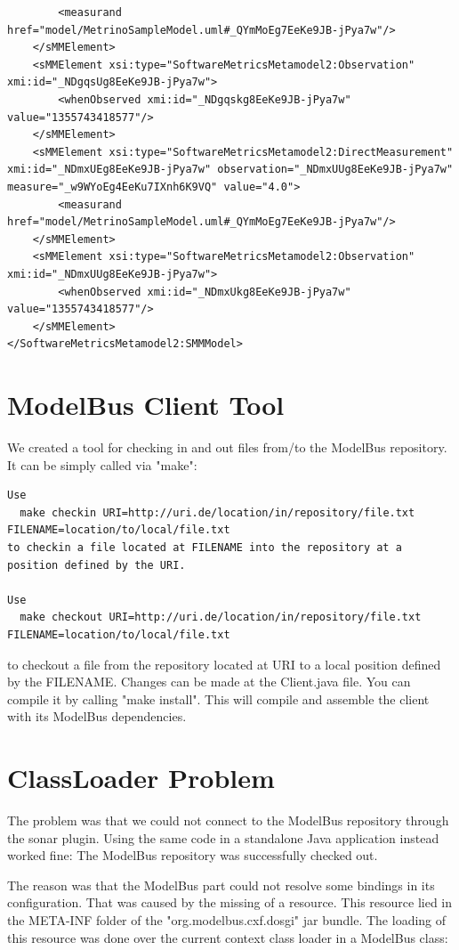 \begin{verbatim}
        <measurand href="model/MetrinoSampleModel.uml#_QYmMoEg7EeKe9JB-jPya7w"/>
    </sMMElement>
    <sMMElement xsi:type="SoftwareMetricsMetamodel2:Observation" xmi:id="_NDgqsUg8EeKe9JB-jPya7w">
        <whenObserved xmi:id="_NDgqskg8EeKe9JB-jPya7w" value="1355743418577"/>
    </sMMElement>
    <sMMElement xsi:type="SoftwareMetricsMetamodel2:DirectMeasurement" xmi:id="_NDmxUEg8EeKe9JB-jPya7w" observation="_NDmxUUg8EeKe9JB-jPya7w" measure="_w9WYoEg4EeKu7IXnh6K9VQ" value="4.0">
        <measurand href="model/MetrinoSampleModel.uml#_QYmMoEg7EeKe9JB-jPya7w"/>
    </sMMElement>
    <sMMElement xsi:type="SoftwareMetricsMetamodel2:Observation" xmi:id="_NDmxUUg8EeKe9JB-jPya7w">
        <whenObserved xmi:id="_NDmxUkg8EeKe9JB-jPya7w" value="1355743418577"/>
    </sMMElement>
</SoftwareMetricsMetamodel2:SMMModel>
\end{verbatim}

\section{ModelBus Client Tool}

We created a tool for checking in and out files from/to the ModelBus repository. It can be simply called via "make":

\begin{verbatim}
Use
  make checkin URI=http://uri.de/location/in/repository/file.txt FILENAME=location/to/local/file.txt
to checkin a file located at FILENAME into the repository at a position defined by the URI.

Use
  make checkout URI=http://uri.de/location/in/repository/file.txt FILENAME=location/to/local/file.txt
\end{verbatim}
to checkout a file from the repository located at URI to a local position defined by the FILENAME.
Changes can be made at the Client.java file. You can compile it by calling "make install". This will compile and assemble the client with its ModelBus dependencies.

\section{ClassLoader Problem}
The problem was that we could not connect to the ModelBus repository through the sonar plugin. Using the same code in a standalone Java application instead worked fine: The ModelBus repository was successfully checked out.

The reason was that the ModelBus part could not resolve some bindings in its configuration. That was caused by the missing of a resource. This resource lied in the META-INF folder of the "org.modelbus.cxf.dosgi" jar bundle. The loading of this resource was done over the current context class loader in a ModelBus class:

